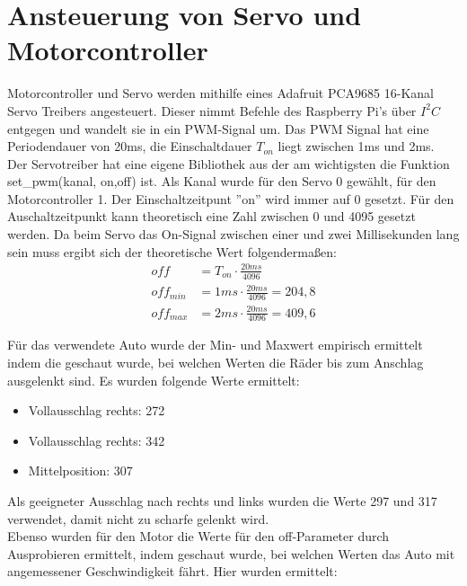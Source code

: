 \section{Ansteuerung von Servo und Motorcontroller}


Motorcontroller und Servo werden mithilfe eines Adafruit PCA9685 16-Kanal Servo Treibers angesteuert. Dieser nimmt Befehle des Raspberry Pi's über $I^2C$ entgegen und wandelt sie in ein PWM-Signal um. Das PWM Signal hat eine Periodendauer von 20ms, die Einschaltdauer $T_{on}$ liegt zwischen 1ms und 2ms. \\
Der Servotreiber hat eine eigene Bibliothek aus der am wichtigsten die Funktion set\_pwm(kanal, on,off) ist. Als Kanal wurde für den Servo 0 gewählt, für den Motorcontroller 1. Der Einschaltzeitpunt ''on'' wird immer auf 0 gesetzt. Für den Auschaltzeitpunkt kann theoretisch eine Zahl zwischen 0 und 4095 gesetzt werden. Da beim Servo das On-Signal zwischen einer und zwei Millisekunden lang sein muss ergibt sich der theoretische Wert folgendermaßen: \\

\begin{align*}
	off&=T_{on}\cdot\frac{20ms}{4096}\\
	off_{min}&=1ms\cdot\frac{20ms}{4096} =204,8\\
	off_{max}&=2ms\cdot\frac{20ms}{4096} = 409,6
\end{align*}

Für das verwendete Auto wurde der Min- und Maxwert empirisch ermittelt indem die geschaut wurde, bei welchen Werten die Räder bis zum Anschlag ausgelenkt sind. Es wurden folgende Werte ermittelt:\\

\begin{itemize}
	\item Vollausschlag rechts: 272
	\item Vollausschlag rechts: 342
	\item Mittelposition: 307
\end{itemize}

Als geeigneter Ausschlag nach rechts und links wurden die Werte 297 und 317 verwendet, damit nicht zu scharfe gelenkt wird.\\

Ebenso wurden für den Motor die Werte für den off-Parameter durch Ausprobieren ermittelt, indem geschaut wurde, bei welchen Werten das Auto mit angemessener Geschwindigkeit fährt. Hier wurden ermittelt:\\

